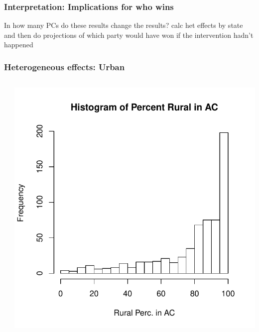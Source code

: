 \documentclass{beamer}
\begin{document}
\begin{frame}
\frametitle{Interpretation: Implications for who wins}

In how many PCs do these results change the results?
calc het effects by state and then do projections of which party would have won if the intervention hadn't happened

\end{frame}


\begin{frame}
\frametitle{Heterogeneous effects: Urban}
\begin{columns}[T] %
\begin{column}{.48\textwidth}
\end{column}%
\hfill%
\begin{column}{.48\textwidth}
\vspace{-10pt}
\includegraphics[scale=.45]{../Figures/histrurpc.pdf}
\end{column}%
\end{columns}
\end{frame}
\end{document}
